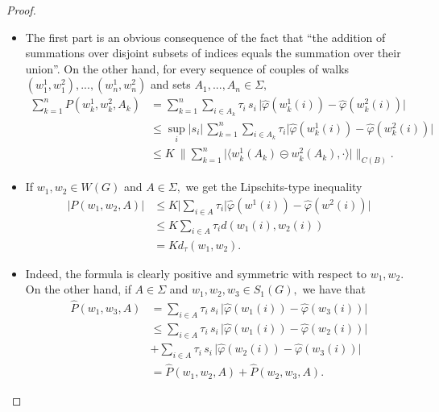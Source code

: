 \documentclass[10pt,a4paper]{amsart}
\begin{document}
\begin{proof}
\begin{itemize}
\item[(i)] The first part is an obvious consequence of the fact that ``the addition of summations over disjoint subsets of indices equals the summation over their union''.
On the other hand, 
for every sequence of couples of walks $(w^1_1,w^2_1), ..., (w^1_n, w^2_n)$ and sets $A_1,...,A_n \in \Sigma,$
\begin{align*}
\sum_{k=1}^n P(w^1_k,w^2_k, A_k) &= \sum_{k=1}^n \sum_{i \in A_k} \tau_i \, s_i \, \big| \widehat \varphi(w^1_k(i))-  \widehat \varphi(w^2_k(i)) \big| \\
&\le \sup_{i} |s_i| \,
\sum_{k=1}^n \sum_{i \in A_k} \tau_i  \big| \widehat \varphi(w^1_k(i))-  \widehat \varphi(w^2_k(i)) \big| \\
&\le K \ \Big\|
 \sum_{k=1}^n \big| \langle w^1_k(A_k) \circleddash w^2_k(A_k), \cdot \rangle \big| \Big\|_{C(B)}.
\end{align*}

\item[(ii)] If $w_1,w_2 \in W(G)$ and $A \in \Sigma,$ we get the Lipschits-type inequality
\begin{align*}
\big| P(w_1,w_2,A) \big| &\le K \Big| \sum_{i \in A} \tau_i  \big| \widehat \varphi(w^1(i))-  \widehat \varphi(w^2(i)) \big| \\
&\le K \sum_{i \in A} \tau_i d(w_1(i), w_2(i)) \\
&= K d_\tau(w_1,w_2).
\end{align*}

\item[(iii)] Indeed, the formula is clearly positive and symmetric with respect to $w_1,w_2.$ On the other hand, if $A \in \Sigma$ and $w_1,w_2, w_3 \in S_1(G),$ we have that
\begin{align*}
\widehat P(w_1,w_3,A) &= \sum_{i \in A} \tau_i \, s_i \, \big| \widehat \varphi(w_1(i))-  \widehat \varphi(w_3(i)) \big| \\
&\le
\sum_{i \in A} \tau_i \, s_i \, \big| \widehat \varphi(w_1(i))-  \widehat \varphi(w_2(i)) \big| 
\\ 
& +
\sum_{i \in A} \tau_i \, s_i \, \big| \widehat \varphi(w_2(i))-  \widehat \varphi(w_3(i)) \big| \\
&= \widehat P(w_1,w_2,A) + \widehat P(w_2,w_3,A).
\end{align*}
\end{itemize}

\end{proof}
\end{document}
